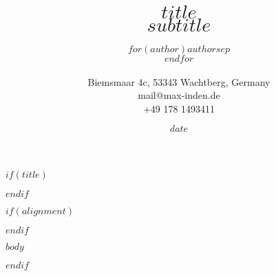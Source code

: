 \documentclass[10pt]{article}
\title{$title$ \\ $subtitle$}
\author{$for(author)$$author$$sep$\\$endfor$ \\ \\ \small Biemsmaar 4c,  53343 Wachtberg,  Germany \\ \small  mail@max-inden.de \\ \small  +49 178 1493411}
\date{}
\date{$date$}
\begin{document}
$if(title)$
\maketitle
$endif$

% 


$if(alignment)$
\begin{$alignment$}
$endif$

$body$

\end{$alignment$}
$endif$
\end{document}
